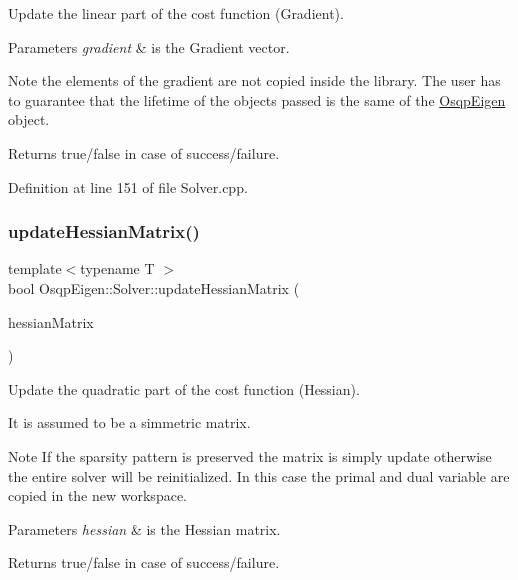 Update the linear part of the cost function (Gradient). 


\begin{DoxyParams}{Parameters}
{\em gradient} & is the Gradient vector. \\
\hline
\end{DoxyParams}
\begin{DoxyNote}{Note}
the elements of the gradient are not copied inside the library. The user has to guarantee that the lifetime of the objects passed is the same of the \mbox{\hyperlink{namespaceOsqpEigen}{Osqp\+Eigen}} object. 
\end{DoxyNote}
\begin{DoxyReturn}{Returns}
true/false in case of success/failure. 
\end{DoxyReturn}


Definition at line 151 of file Solver.\+cpp.

\mbox{\label{classOsqpEigen_1_1Solver_a3380601ced1a2db8b226f7a32e5dd6b3}} 
\subsubsection{\texorpdfstring{update\+Hessian\+Matrix()}{updateHessianMatrix()}\hspace{0.1cm}{\footnotesize\ttfamily [1/2]}}
{\footnotesize\ttfamily template$<$typename T $>$ \\
bool Osqp\+Eigen\+::\+Solver\+::update\+Hessian\+Matrix (\begin{DoxyParamCaption}\item[{const Eigen\+::\+Sparse\+Matrix$<$ T $>$ \&}]{hessian\+Matrix }\end{DoxyParamCaption})}



Update the quadratic part of the cost function (Hessian). 

It is assumed to be a simmetric matrix. \begin{DoxyNote}{Note}
If the sparsity pattern is preserved the matrix is simply update otherwise the entire solver will be reinitialized. In this case the primal and dual variable are copied in the new workspace.
\end{DoxyNote}

\begin{DoxyParams}{Parameters}
{\em hessian} & is the Hessian matrix. \\
\hline
\end{DoxyParams}
\begin{DoxyReturn}{Returns}
true/false in case of success/failure. 
\end{DoxyReturn}


